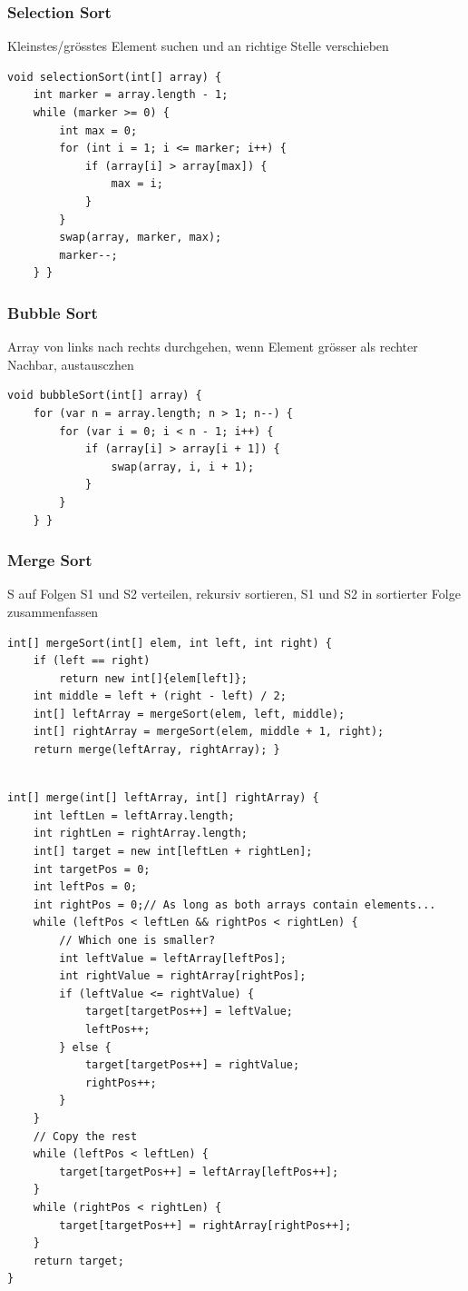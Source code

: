 \begin{multicols*}{4}
		\subsubsection{Selection Sort}
		Kleinstes/grösstes Element suchen und an richtige Stelle verschieben
		
			\begin{lstlisting}
void selectionSort(int[] array) {
	int marker = array.length - 1;
	while (marker >= 0) {
		int max = 0;
		for (int i = 1; i <= marker; i++) {
			if (array[i] > array[max]) {
				max = i;
			}
		}
		swap(array, marker, max);
		marker--;
	} }
			\end{lstlisting}
		
		\subsubsection{Bubble Sort}
		Array von links nach rechts durchgehen, wenn Element grösser als rechter Nachbar, austausczhen
			\begin{lstlisting}
void bubbleSort(int[] array) {
	for (var n = array.length; n > 1; n--) {
		for (var i = 0; i < n - 1; i++) {
			if (array[i] > array[i + 1]) {
				swap(array, i, i + 1);
			}
		}
	} }
			\end{lstlisting}
		

\columnbreak
		
		\subsubsection{Merge Sort}
		S auf Folgen S1 und S2 verteilen, rekursiv sortieren, S1 und S2 in sortierter Folge zusammenfassen
			\begin{lstlisting}
int[] mergeSort(int[] elem, int left, int right) {
	if (left == right)
	  	return new int[]{elem[left]};
	int middle = left + (right - left) / 2;
	int[] leftArray = mergeSort(elem, left, middle);
	int[] rightArray = mergeSort(elem, middle + 1, right);
	return merge(leftArray, rightArray); }
	
\end{lstlisting}
\begin{lstlisting}
int[] merge(int[] leftArray, int[] rightArray) {
	int leftLen = leftArray.length;
	int rightLen = rightArray.length;
	int[] target = new int[leftLen + rightLen];
	int targetPos = 0;
	int leftPos = 0;
	int rightPos = 0;// As long as both arrays contain elements...
	while (leftPos < leftLen && rightPos < rightLen) {
		// Which one is smaller?
		int leftValue = leftArray[leftPos];
		int rightValue = rightArray[rightPos];
		if (leftValue <= rightValue) {
			target[targetPos++] = leftValue;
			leftPos++;
		} else {
			target[targetPos++] = rightValue;
			rightPos++;
		}
	}
    // Copy the rest
	while (leftPos < leftLen) {
		target[targetPos++] = leftArray[leftPos++];
	}
	while (rightPos < rightLen) {
		target[targetPos++] = rightArray[rightPos++];
	}
	return target;
}
			\end{lstlisting}
		

\end{multicols*}
